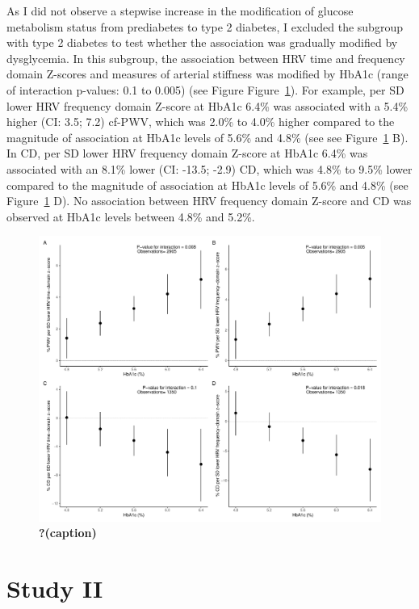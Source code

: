\documentclass[
  a4paper,
  headsepline=true,
  open=any]{scrbook}
\begin{document}
As I did not observe a stepwise increase in the modification of glucose
metabolism status from prediabetes to type 2 diabetes, I excluded the
subgroup with type 2 diabetes to test whether the association was
gradually modified by dysglycemia. In this subgroup, the association
between HRV time and frequency domain Z-scores and measures of arterial
stiffness was modified by HbA1c (range of interaction p-values: 0.1 to
0.005) (see Figure Figure~\ref{fig-MS-HRV}). For example, per SD lower
HRV frequency domain Z-score at HbA1c 6.4\% was associated with a 5.4\%
higher (CI: 3.5; 7.2) cf-PWV, which was 2.0\% to 4.0\% higher compared
to the magnitude of association at HbA1c levels of 5.6\% and 4.8\% (see
see Figure~\ref{fig-MS-HRV} B). In CD, per SD lower HRV frequency domain
Z-score at HbA1c 6.4\% was associated with an 8.1\% lower (CI: -13.5;
-2.9) CD, which was 4.8\% to 9.5\% lower compared to the magnitude of
association at HbA1c levels of 5.6\% and 4.8\% (see
Figure~\ref{fig-MS-HRV} D). No association between HRV frequency domain
Z-score and CD was observed at HbA1c levels between 4.8\% and 5.2\%.

\begin{figure}

{\centering \includegraphics{images/em_hba1c.pdf}

}

\caption{\label{fig-MS-HRV}\textbf{?(caption)}}

\end{figure}

\hypertarget{study-ii}{%
\section{Study II}\label{study-ii}}
\end{document}
